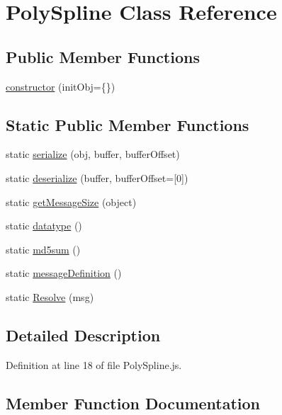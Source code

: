 \hypertarget{class_poly_spline}{}\section{Poly\+Spline Class Reference}
\label{class_poly_spline}
\subsection*{Public Member Functions}
\begin{DoxyCompactItemize}
\item 
\hyperlink{class_poly_spline_a1b06dcfe3d4ed3b0eeda90247e6df382}{constructor} (init\+Obj=\{\})
\end{DoxyCompactItemize}
\subsection*{Static Public Member Functions}
\begin{DoxyCompactItemize}
\item 
static \hyperlink{class_poly_spline_a84b8da4742dcf2b5e836760ab7d32293}{serialize} (obj, buffer, buffer\+Offset)
\item 
static \hyperlink{class_poly_spline_ad36b1ed96f109b74e90c859a1f5c22b6}{deserialize} (buffer, buffer\+Offset=\mbox{[}0\mbox{]})
\item 
static \hyperlink{class_poly_spline_a7cee33b4ad00afaedf5e916b9e0b7dd6}{get\+Message\+Size} (object)
\item 
static \hyperlink{class_poly_spline_a927da3b31f114e0982d0fd1fb425dd00}{datatype} ()
\item 
static \hyperlink{class_poly_spline_aba9f40d319d45aeb9d00e689c31f0182}{md5sum} ()
\item 
static \hyperlink{class_poly_spline_abf17190de46fb41df310b017f255a99d}{message\+Definition} ()
\item 
static \hyperlink{class_poly_spline_a96298f698416399784e545108a023782}{Resolve} (msg)
\end{DoxyCompactItemize}


\subsection{Detailed Description}


Definition at line 18 of file Poly\+Spline.\+js.



\subsection{Member Function Documentation}
